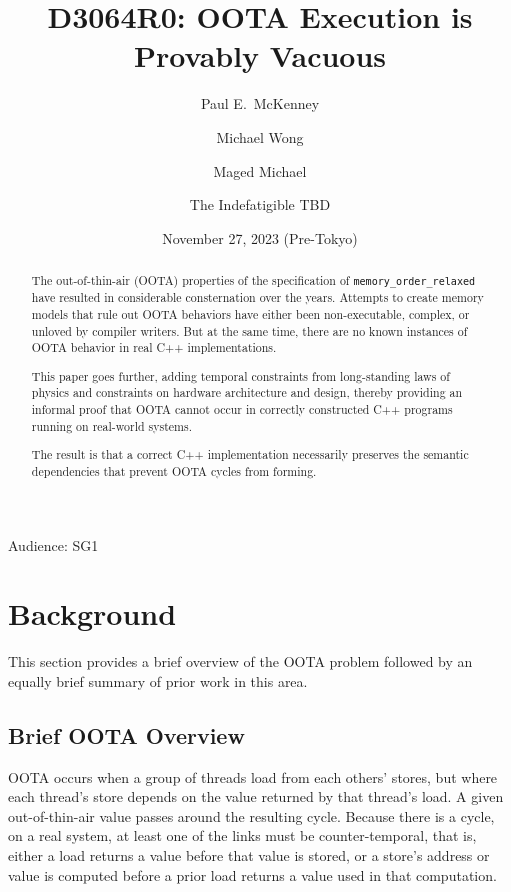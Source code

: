 \documentclass[10]{article}
\begin{document}
\title{D3064R0: OOTA Execution is Provably Vacuous}

\newcommand{\co}[1]{\lstinline[breaklines=yes,breakatwhitespace=yes]{#1}}

\author{
Paul E.~McKenney\\ \and
Michael Wong\\ \and
Maged Michael\\ \and
The Indefatigible TBD
}
\date{November 27, 2023 (Pre-Tokyo)}
\maketitle{}

Audience: SG1

\begin{abstract}
	The out-of-thin-air (OOTA) properties of the specification
	of \co{memory_order_relaxed} have resulted in considerable
	consternation over the years.
	Attempts to create memory models that rule out OOTA behaviors
	have either been non-executable, complex, or unloved by compiler
	writers.
	But at the same time, there are no known instances of OOTA
	behavior in real C++ implementations.

	This paper goes further, adding temporal constraints from
	long-standing laws of physics and constraints on hardware
	architecture and design, thereby providing an informal
	proof that OOTA cannot occur in correctly constructed C++
	programs running on real-world systems.

	The result is that a correct C++ implementation necessarily
	preserves the semantic dependencies that prevent OOTA
	cycles from forming.
\end{abstract}

\section{Background}
\label{sec:Background}

This section provides a brief overview of the OOTA problem followed
by an equally brief summary of prior work in this area.

\subsection{Brief OOTA Overview}
\label{sec:Brief OOTA Overview}

OOTA occurs when a group of threads load from each others' stores,
but where each thread's store depends on the value returned by that
thread's load.
A given out-of-thin-air value passes around the resulting cycle.
Because there is a cycle, on a real system, at least one of the links
must be counter-temporal, that is, either a load returns a value before
that value is stored, or a store's address or value is computed before
a prior load returns a value used in that computation.
\end{document}
